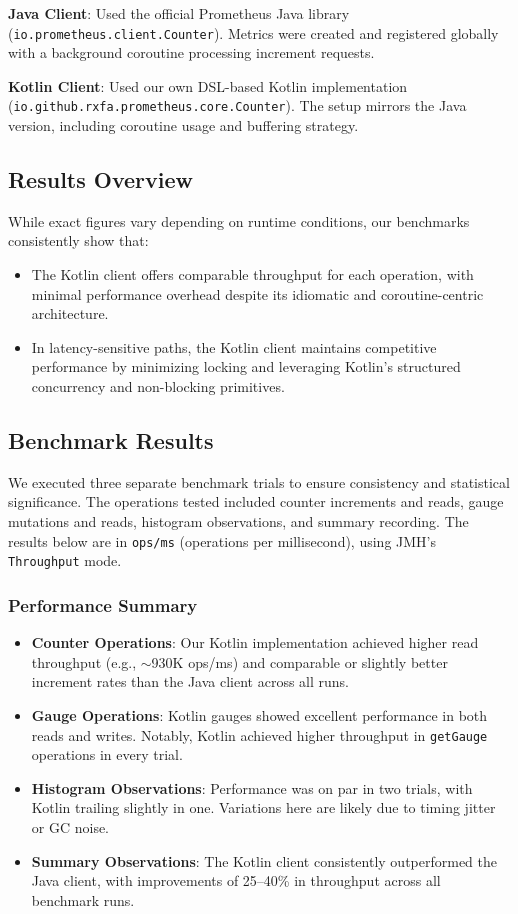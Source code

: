 \textbf{Java Client}: Used the official Prometheus Java library (\texttt{io.prometheus.client.Counter}). Metrics were created and registered globally with a background coroutine processing increment requests.

\textbf{Kotlin Client}: Used our own DSL-based Kotlin implementation (\texttt{io.github.rxfa.prometheus.core.Counter}). The setup mirrors the Java version, including coroutine usage and buffering strategy.

\subsection*{Results Overview}

While exact figures vary depending on runtime conditions, our benchmarks consistently show that:
\begin{itemize}
    \item The Kotlin client offers comparable throughput for each operation, with minimal performance overhead despite its idiomatic and coroutine-centric architecture.
    \item In latency-sensitive paths, the Kotlin client maintains competitive performance by minimizing locking and leveraging Kotlin’s structured concurrency and non-blocking primitives.
\end{itemize}


\subsection*{Benchmark Results}

We executed three separate benchmark trials to ensure consistency and statistical significance. The operations tested included counter increments and reads, gauge mutations and reads, histogram observations, and summary recording. The results below are in \texttt{ops/ms} (operations per millisecond), using JMH's \texttt{Throughput} mode.

\subsubsection*{Performance Summary}

\begin{itemize}
    \item \textbf{Counter Operations}: Our Kotlin implementation achieved higher read throughput (e.g., $\sim$930K ops/ms) and comparable or slightly better increment rates than the Java client across all runs.
    \item \textbf{Gauge Operations}: Kotlin gauges showed excellent performance in both reads and writes. Notably, Kotlin achieved higher throughput in \texttt{getGauge} operations in every trial.
    \item \textbf{Histogram Observations}: Performance was on par in two trials, with Kotlin trailing slightly in one. Variations here are likely due to timing jitter or GC noise.
    \item \textbf{Summary Observations}: The Kotlin client consistently outperformed the Java client, with improvements of 25–40\% in throughput across all benchmark runs.
\end{itemize}

